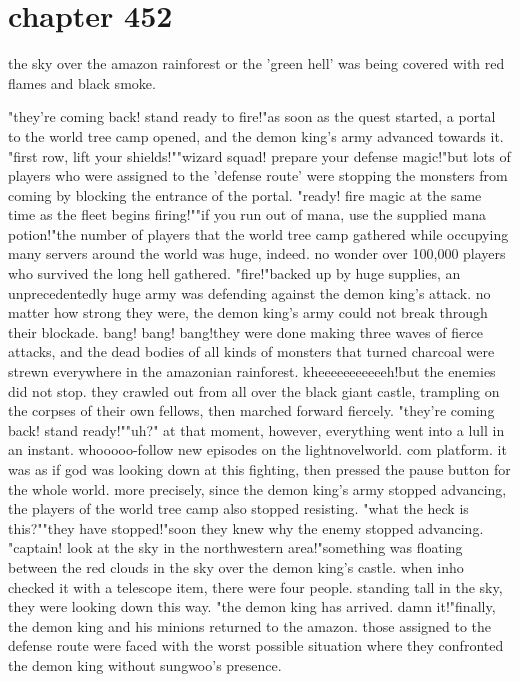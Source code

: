 \section{chapter 452}

the sky over the amazon rainforest or the 'green hell' was being covered with red flames and black smoke.





"they're coming back! stand ready to fire!"as soon as the quest started, a portal to the world tree camp opened, and the demon king's army advanced towards it.
"first row, lift your shields!""wizard squad! prepare your defense magic!"but lots of players who were assigned to the 'defense route' were stopping the monsters from coming by blocking the entrance of the portal.
 "ready! fire magic at the same time as the fleet begins firing!""if you run out of mana, use the supplied mana potion!"the number of players that the world tree camp gathered while occupying many servers around the world was huge, indeed.
 no wonder over 100,000 players who survived the long hell gathered.
"fire!"backed up by huge supplies, an unprecedentedly huge army was defending against the demon king's attack.
 no matter how strong they were, the demon king's army could not break through their blockade.
 bang! bang! bang!they were done making three waves of fierce attacks, and the dead bodies of all kinds of monsters that turned charcoal were strewn everywhere in the amazonian rainforest.
 kheeeeeeeeeeeh!but the enemies did not stop.
 they crawled out from all over the black giant castle, trampling on the corpses of their own fellows, then marched forward fiercely.
"they're coming back! stand ready!""uh?"
at that moment, however, everything went into a lull in an instant.
whooooo-follow new episodes on the lightnovelworld.
com platform.
it was as if god was looking down at this fighting, then pressed the pause button for the whole world.
 more precisely, since the demon king's army stopped advancing, the players of the world tree camp also stopped resisting.
"what the heck is this?""they have stopped!"soon they knew why the enemy stopped advancing.
 "captain! look at the sky in the northwestern area!"something was floating between the red clouds in the sky over the demon king's castle.
 when inho checked it with a telescope item, there were four people.
standing tall in the sky, they were looking down this way.
"the demon king has arrived.
 damn it!"finally, the demon king and his minions returned to the amazon.
those assigned to the defense route were faced with the worst possible situation where they confronted the demon king without sungwoo's presence.
